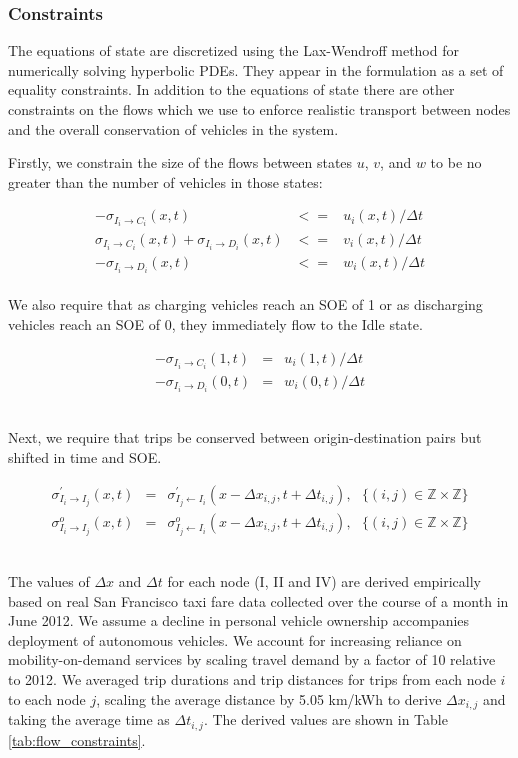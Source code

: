 \documentclass[journal]{IEEEtran}
\begin{document}
\subsubsection{Constraints}

The equations of state are discretized using the Lax-Wendroff method for numerically solving hyperbolic PDEs. They appear in the formulation as a set of equality constraints. In addition to the equations of state there are other constraints on the flows which we use to enforce realistic transport between nodes and the overall conservation of vehicles in the system. 

Firstly, we constrain the size of the flows between states $u$, $v$, and $w$ to be no greater than the number of vehicles in those states:

\begin{eqnarray*}
    -\sigma_{I_i \rightarrow C_i}(x,t) & <= & u_i(x,t) / \Delta t \\
    \sigma_{I_i \rightarrow C_i}(x,t) + \sigma_{I_i \rightarrow D_i}(x,t) & <= & v_i(x,t) / \Delta t \\
    -\sigma_{I_i \rightarrow D_i}(x,t) & <= & w_i(x,t) / \Delta t
\end{eqnarray*}
~\\ 
We also require that as charging vehicles reach an SOE of 1 or as discharging vehicles reach an SOE of 0, they immediately flow to the Idle state.

\begin{eqnarray*}
    -\sigma_{I_i \rightarrow C_i}(1,t) & = & u_i(1,t) / \Delta t \\
    -\sigma_{I_i \rightarrow D_i}(0,t) & = & w_i(0,t) / \Delta t
\end{eqnarray*}

~\\ 
Next, we require that trips be conserved between origin-destination pairs but shifted in time and SOE.

\begin{eqnarray*}
    \sigma_{I_i \rightarrow I_j}^\prime(x,t) & = & \sigma_{I_j \leftarrow I_i}^\prime(x - \Delta x_{i,j},t + \Delta t_{i,j}), ~~~ \{(i,j) \in \mathbb{Z} \times \mathbb{Z}\} \\
     \sigma_{I_i \rightarrow I_j}^o(x,t) & = & \sigma_{I_j \leftarrow I_i}^o(x - \Delta x_{i,j},t + \Delta t_{i,j}), ~~~ \{(i,j) \in \mathbb{Z} \times \mathbb{Z}\}
\end{eqnarray*}

~\\ 
The values of $\Delta x$ and $\Delta t$ for each node (I, II and IV) are derived empirically based on real San Francisco taxi fare data collected over the course of a month in June 2012. We assume a decline in personal vehicle ownership accompanies deployment of autonomous vehicles. We account for increasing reliance on mobility-on-demand services by scaling travel demand by a factor of 10 relative to 2012. We averaged trip durations and trip distances for trips from each node $i$ to each node $j$, scaling the average distance by 5.05 km/kWh to derive $\Delta x_{i,j}$ and taking the average time as $\Delta t_{i,j}$. The derived values are shown in Table \ref{tab:flow_constraints}.
\end{document}
